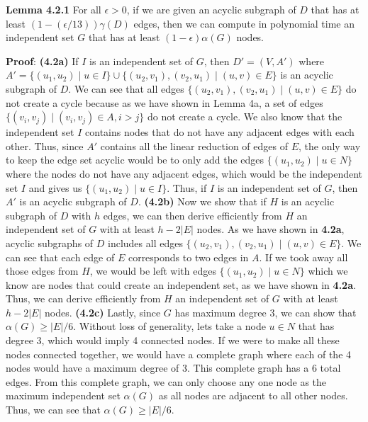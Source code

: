 \documentclass[oneside]{homework} %
\begin{document}
\textbf{Lemma 4.2.1} For all $\epsilon > 0$, if we are given an acyclic subgraph of $D$ that has at least $(1-(\epsilon/13))\gamma(D)$ edges, then we can compute in polynomial time an independent set $G$ that has at least $(1-\epsilon)\alpha(G)$ nodes.
\newline

\textbf{Proof}:
\newline
\textbf{(4.2a)} If $I$ is an independent set of $G$, then $D' = (V, A')$ where $A' = \{(u_1, u_2) \mid u \in I\} \cup \{(u_2, v_1), (v_2, u_1) \mid (u, v) \in E\}$ is an acyclic subgraph of $D$. We can see that all edges $\{(u_2, v_1), (v_2, u_1) \mid (u, v) \in E\}$ do not create a cycle because as we have shown in Lemma 4a, a set of edges $\{(v_i, v_j) \mid (v_i, v_j) \in A, i > j\}$ do not create a cycle. We also know that the independent set $I$ contains nodes that do not have any adjacent edges with each other. Thus, since $A'$ contains all the linear reduction of edges of $E$, the only way to keep the edge set acyclic would be to only add the edges $\{(u_1, u_2) \mid u \in N\}$ where the nodes do not have any adjacent edges, which would be the independent set $I$ and gives us $\{(u_1, u_2) \mid u \in I\}$. Thus, if $I$ is an independent set of $G$, then $A'$ is an acyclic subgraph of $D$.
\newline
\newline
\textbf{(4.2b)} Now we show that if $H$ is an acyclic subgraph of $D$ with $h$ edges, we can then derive efficiently from $H$ an independent set of $G$ with at least $h-2|E|$ nodes. As we have shown in \textbf{4.2a}, acyclic subgraphs of $D$ includes all edges $\{(u_2, v_1), (v_2, u_1) \mid (u, v) \in E\}$.  We can see that each edge of $E$ corresponds to two edges in $A$. If we took away all those edges from $H$, we would be left with edges $\{(u_1, u_2) \mid u \in N\}$ which we know are nodes that could create an independent set, as we have shown in \textbf{4.2a}. Thus, we can derive efficiently from $H$ an independent set of $G$ with at least $h-2|E|$ nodes.
\newline
\newline
\textbf{(4.2c)} Lastly, since $G$ has maximum degree 3, we can show that $\alpha(G) \geq |E|/6$. Without loss of generality, lets take a node $u \in N$ that has degree 3, which would imply 4 connected nodes. If we were to make all these nodes connected together, we would have a complete graph where each of the 4 nodes would have a maximum degree of 3. This complete graph has a 6 total edges. From this complete graph, we can only choose any one node as the maximum independent set $\alpha(G)$ as all nodes are adjacent to all other nodes. Thus, we can see that $\alpha(G) \geq |E|/6$.
\end{document}
